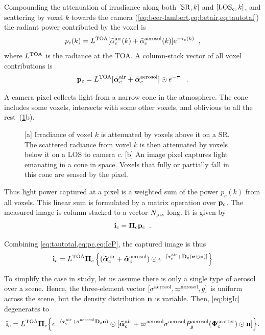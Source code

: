 \documentclass[10pt,letterpaper]{article}
\newcommand{\vect}[1]{\bm{#1}}
\newcommand{\yoavcomment}[1]{}
\renewcommand{\yoavcomment}[1]{#1} %
\begin{document}
Compounding the attenuation of irradiance along both $[{\rm SR},k]$
and $[{\rm LOS}_c,k]$, and scattering by voxel $k$ towards the camera
(\cref{eq:beer-lambert,eq:betair,eq:tautotal}) the radiant power
contributed by the voxel is
\begin{equation}
  p_c(k)= L^{\rm TOA}
  [\tilde{\alpha}^{\rm air}_c(k) + \tilde{\alpha}^{\rm aerosol}_c(k)]
  e^{-\tau_c(k)}
  \;\;,
  \label{eq:ick}
\end{equation}
where $L^{\rm TOA}$ is the radiance at the TOA. A column-stack vector
of all voxel contributions is
\begin{equation}
  {\bf p}_c= L^{\rm TOA}
  [\tilde{\vect{\alpha}}^{\rm air}_c + \tilde{\vect{\alpha}}^{\rm aerosol}_c]
  \odot e^{-\vect{\tau}_c}
  \;\;.
  \label{eq:pc}
\end{equation}

A camera pixel collects light from a narrow cone in the
atmosphere. The cone includes some voxels, intersects with some other
voxels, and oblivious to all the rest~(\cref{fig:projection}b).
\begin{figure}
  \centering
  \yoavcomment{\def\svgwidth{0.8\columnwidth}}
  \caption{\small [a] Irradiance of voxel $k$ is attenuated by voxels
    above it on a SR. The scattered radiance from voxel $k$ is then
    attenuated by voxels below it on a LOS to camera $c$.  [b] An
    image pixel captures light emanating in a cone in space. Voxels
    that fully or partially fall in this cone are sensed by the
    pixel.}
  \label{fig:projection}
\end{figure}
Thus light power captured at a pixel is a weighted sum of the power
$p_c(k)$ from all voxels.  This linear sum is formulated by a matrix
operation over ${\bf p}_c$. The measured image is column-stacked to a
vector $N_{\rm pix}$ long. It is given by
\begin{equation}
  {\bf i}_c= {\vect{\Pi}}_c{\bf p}_c
  \;\;.
  \label{eq:IcP}
\end{equation}

Combining \cref{eq:tautotal,eq:pc,eq:IcP}, the captured image is thus
\begin{align}
  {\bf i}_c= L^{\rm TOA} {\vect{\Pi}}_c \left\{
    (\tilde{\vect{\alpha}}^{\rm air}_c + \tilde{\vect{\alpha}}^{\rm
      aerosol}_c) \odot e^{-[\vect{\tau}_c^{\rm air} + {\bf D}_c
      (\vect{\sigma} \odot {\bf n})]} \right\}
  \label{eq:bigIc}
\end{align}

To simplify the case in study, let us assume there is only a single
type of aerosol over a scene. Hence, the three-element vector
$[{\sigma}^{\rm aerosol},\varpi^{\rm aerosol},g]$ is uniform across
the scene, but the density distribution ${\bf n}$ is variable. Then,
\cref{eq:bigIc} degenerates to
\begin{align}
  {\bf i}_c= L^{\rm TOA} {\vect{\Pi}}_c \Big\{ e^{-(\vect{\tau}_c^{\rm
      air} + {\sigma}^{\rm aerosol} {\bf D}_c {\bf n}) }\odot
  [\tilde{\vect{\alpha}}^{\rm air}_c + 
  \varpi^{\rm aerosol}\sigma^{\rm aerosol} P^{\rm
    aerosol}_g(\vect{\Phi}^{\rm scatter}_c) \odot{\bf n} ] \Big\} .
  \label{eq:bigIA}
\end{align}
\end{document}

